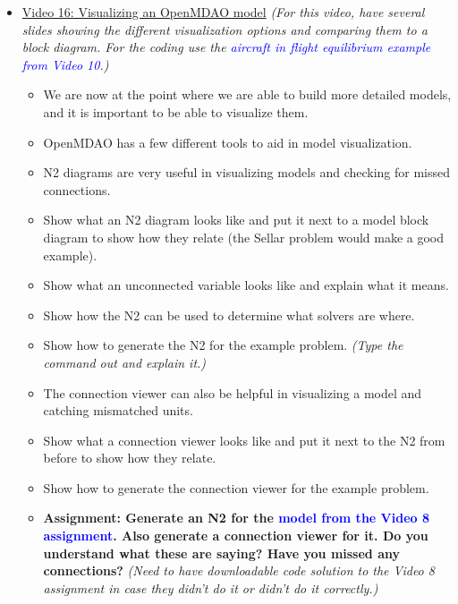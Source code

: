 \documentclass[12pt, letterpaper]{article}
\begin{document}
\begin{itemize}
	\item \underline{Video 16: Visualizing an OpenMDAO model} \textit{(For this video, have several slides showing the different visualization options and comparing them to a block diagram. For the coding use the \textcolor{blue}{aircraft in flight equilibrium example from Video 10}.)}
		\begin{itemize}
			\item We are now at the point where we are able to build more detailed models, and it is important to be able to visualize them.
			\item OpenMDAO has a few different tools to aid in model visualization.
			\item N2 diagrams are very useful in visualizing models and checking for missed connections.
			\item Show what an N2 diagram looks like and put it next to a model block diagram to show how they relate (the Sellar problem would make a good example).
			\item Show what an unconnected variable looks like and explain what it means.
			\item Show how the N2 can be used to determine what solvers are where.
			\item Show how to generate the N2 for the example problem. \textit{(Type the command out and explain it.)}
			\item The connection viewer can also be helpful in visualizing a model and catching mismatched units.
			\item Show what a connection viewer looks like and put it next to the N2 from before to show how they relate.
			\item Show how to generate the connection viewer for the example problem.
			\item \textbf{Assignment: Generate an N2 for the \textcolor{blue}{model from the Video 8 assignment}. Also generate a connection viewer for it. Do you understand what these are saying? Have you missed any connections?} \textit{(Need to have downloadable code solution to the Video 8 assignment in case they didn't do it or didn't do it correctly.)}
		\end{itemize}


\end{itemize}
\end{document}
